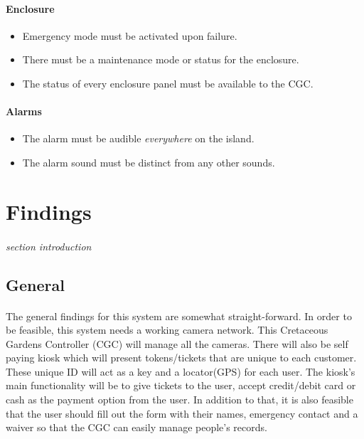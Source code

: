 \documentclass[12pt]{article}
\begin{document}
	\paragraph{Enclosure}
	\begin{itemize}
		\item[] Emergency mode must be activated upon failure.
		\item[] There must be a maintenance mode or status for the enclosure.
		\item[] The status of every enclosure panel must be available to the CGC. 
	\end{itemize}
	
	\paragraph{Alarms}
	\begin{itemize}
		\item[] The alarm must be audible \textit{everywhere} on the island.
		\item[] The alarm sound must be distinct from any other sounds.
	\end{itemize}
            
\section{Findings}
\paragraph{} \textit{section introduction}
	\subsection{General}
	\paragraph{} The general findings for this system are somewhat straight-forward. 
	In order to be feasible, this system needs a working camera network. This Cretaceous
	Gardens Controller (CGC) will manage all the cameras. There will also be self paying 
	kiosk which will present tokens/tickets that are unique to each customer. These unique 
	ID will act as a key and a locator(GPS) for each user. The kiosk's main functionality 
	will be to give tickets to the user, accept credit/debit card or cash as the payment 
	option from the user. In addition to that, it is also feasible that the user should 
	fill out the form with their names, emergency contact and a waiver so that the CGC 
	can easily manage people's records. 
\end{document}
